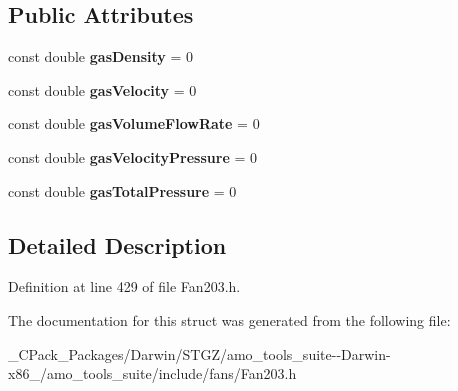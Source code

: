 \subsection*{Public Attributes}
\begin{DoxyCompactItemize}
\item 
\mbox{\label{struct_plane_data_1_1_node_binding_1_1_data_ab95d17426cc7d8141e904baf96a12340}} 
const double {\bfseries gas\+Density} = 0
\item 
\mbox{\label{struct_plane_data_1_1_node_binding_1_1_data_a334b80114bbe976623a7e24fbd546d51}} 
const double {\bfseries gas\+Velocity} = 0
\item 
\mbox{\label{struct_plane_data_1_1_node_binding_1_1_data_a5cbd28074d5a930f0267a9d60b83a04d}} 
const double {\bfseries gas\+Volume\+Flow\+Rate} = 0
\item 
\mbox{\label{struct_plane_data_1_1_node_binding_1_1_data_aa0892de35b2ecc840e2bcdca79f5d1a2}} 
const double {\bfseries gas\+Velocity\+Pressure} = 0
\item 
\mbox{\label{struct_plane_data_1_1_node_binding_1_1_data_a819380996458306f772c305df01d8dba}} 
const double {\bfseries gas\+Total\+Pressure} = 0
\end{DoxyCompactItemize}


\subsection{Detailed Description}


Definition at line 429 of file Fan203.\+h.



The documentation for this struct was generated from the following file\+:\begin{DoxyCompactItemize}
\item 
\+\_\+\+C\+Pack\+\_\+\+Packages/\+Darwin/\+S\+T\+G\+Z/amo\+\_\+tools\+\_\+suite-\/-\/\+Darwin-\/x86\+\_/amo\+\_\+tools\+\_\+suite/include/fans/Fan203.\+h\end{DoxyCompactItemize}
